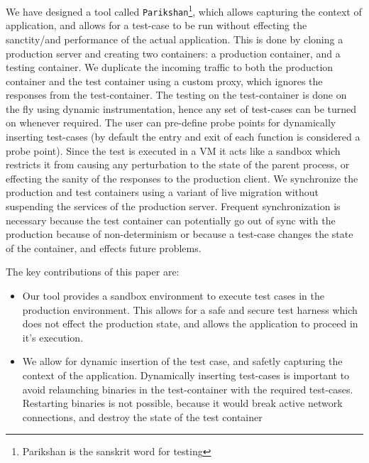 We have designed a tool called \texttt{Parikshan}\footnote{Parikshan is the sanskrit word for testing}, which allows capturing the context of application, and allows for a test-case to be run without effecting the sanctity/and performance of the actual application. 
This is done by cloning a production server and creating two containers: a production container, and a testing container. 
We duplicate the incoming traffic to both the production container and the test container using a custom proxy, which ignores the responses from the test-container. 
The testing on the test-container is done on the fly using dynamic instrumentation, hence any set of test-cases can be turned on whenever required. 
The user can pre-define probe points for dynamically inserting test-cases (by default the entry and exit of each function is considered a probe point).
Since the test is executed in a VM it acts like a sandbox which restricts it from causing any perturbation to the state of the parent process, or effecting the sanity of the responses to the production client. 
We synchronize the production and test containers using a variant of live migration without suspending the services of the production server. 
Frequent synchronization is necessary because the test container can potentially go out of sync with the production because of non-determinism or because a test-case changes the state of the container, and effects future problems. 


The key contributions of this paper are:

\begin{itemize}
\item Our tool provides a sandbox environment to execute test cases in the production environment. 
This allows for a safe and secure test harness which does not effect the production state, and allows the application to proceed in it's execution.
\item We allow for dynamic insertion of the test case, and safetly capturing the context of the application. Dynamically inserting test-cases is important to avoid relaunching binaries in the test-container with the required test-cases. 
Restarting binaries is not possible, because it would break active network connections, and destroy the state of the test container
\end{itemize}

